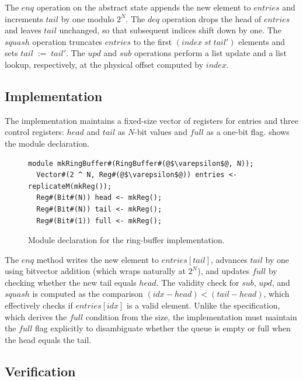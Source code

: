 \documentclass[fontset=fira-newtxsf]{mitthesis}
\theoremstyle{definition}
\theoremstyle{plain}
\begin{document}
The $\mathit{enq}$ operation on the abstract state appends the new element to $\mathit{entries}$ and increments $\mathit{tail}$ by one modulo $2^{N}$.
The $\mathit{deq}$ operation drops the head of $\mathit{entries}$ and leaves $\mathit{tail}$ unchanged, so that subsequent indices shift down by one.
The $\mathit{squash}$ operation truncates $\mathit{entries}$ to the first $\mathit{(index\;st\;tail')}$ elements and sets $\mathit{tail\;:=\;tail'}$.
The $\mathit{upd}$ and $\mathit{sub}$ operations perform a list update and a list lookup, respectively, at the physical offset computed by $\mathit{index}$.

\subsection{Implementation}

The implementation maintains a fixed-size vector of registers for entries and three control registers: $\mathit{head}$ and $\mathit{tail}$ as $N$-bit values and $\mathit{full}$ as a one-bit flag.
 shows the module declaration.

\begin{figure}[ht]
\begin{verbatim}
module mkRingBuffer#(RingBuffer#(@$\varepsilon$@, N));
  Vector#(2 ^ N, Reg#(@$\varepsilon$@)) entries <- replicateM(mkReg());
  Reg#(Bit#(N)) head <- mkReg();
  Reg#(Bit#(N)) tail <- mkReg();
  Reg#(Bit#(1)) full <- mkReg();
\end{verbatim}
\caption[Ring-buffer implementation]{Module declaration for the ring-buffer implementation.}
\label{fig:rb-impl}
\end{figure}

The $\mathit{enq}$ method writes the new element to $\mathit{entries[tail]}$, advances $\mathit{tail}$ by one using bitvector addition (which wraps naturally at $2^N$), and updates $\mathit{full}$ by checking whether the new tail equals $\mathit{head}$.
The validity check for $\mathit{sub}$, $\mathit{upd}$, and $\mathit{squash}$ is computed as the comparison $\mathit{(idx - head) < (tail - head)}$, which effectively checks if $\mathit{entries[idx]}$ is a valid element.
Unlike the specification, which derives the $\mathit{full}$ condition from the size, the implementation must maintain the $\mathit{full}$ flag explicitly to disambiguate whether the queue is empty or full when the head equals the tail.

\subsection{Verification}
\end{document}
